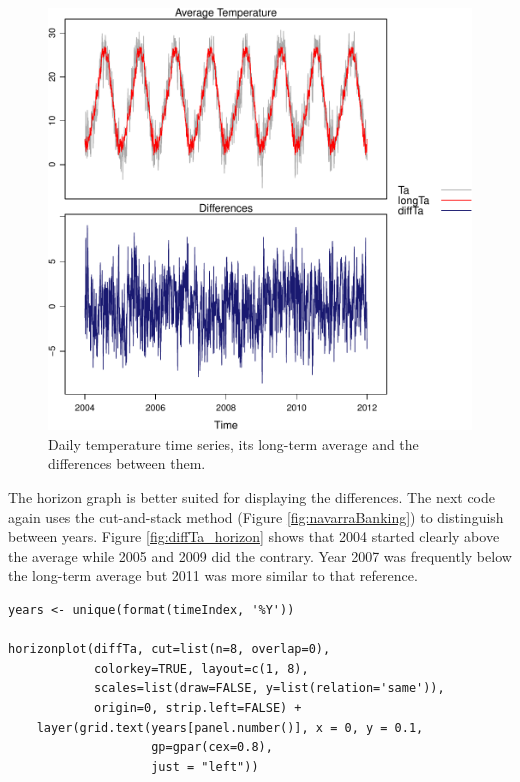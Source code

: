\documentclass[smallroyalvopaper]{memoir}
\begin{document}
\begin{figure}[htb]
\centering
\includegraphics[width=.9\linewidth]{figs/diffTa_xyplot.pdf}
\caption{\label{fig:diffTa_xyplot}Daily temperature time series, its long-term average and the differences between them.}
\end{figure}

The horizon graph is better suited for displaying the differences. The
next code again uses the cut-and-stack method (Figure
\ref{fig:navarraBanking}) to distinguish between years. Figure
\ref{fig:diffTa_horizon} shows that 2004 started clearly above the
average while 2005 and 2009 did the contrary. Year 2007 was frequently
below the long-term average but 2011 was more similar to that
reference.
\lstset{language=R,numbers=none}
\begin{lstlisting}
years <- unique(format(timeIndex, '%Y'))

horizonplot(diffTa, cut=list(n=8, overlap=0),
            colorkey=TRUE, layout=c(1, 8),
            scales=list(draw=FALSE, y=list(relation='same')),
            origin=0, strip.left=FALSE) +
    layer(grid.text(years[panel.number()], x = 0, y = 0.1, 
                    gp=gpar(cex=0.8),
                    just = "left"))
\end{lstlisting}
\end{document}
